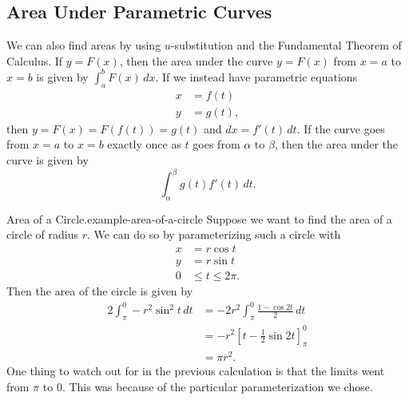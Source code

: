 \documentclass[10pt,]{book}
\numberwithin{equation}{section}
\newcommand{\amp}{&}
\begin{document}
\subsection[{Area Under Parametric Curves}]{Area Under Parametric Curves}\label{subsection-area-under-parametric-curves}
\hypertarget{p-1007}{}%
We can also find areas by using \(u\)-substitution and the Fundamental Theorem of Calculus. If \(y = F(x)\), then the area under the curve \(y=F(x)\) from \(x=a\) to \(x=b\) is given by \(\int_{a}^{b} F(x)\,dx\). If we instead have parametric equations%
\begin{align*}
x \amp = f(t) \\
y \amp = g(t), 
\end{align*}
then \(y = F(x) = F(f(t)) = g(t)\) and \(dx = f'(t)\,dt\). If the curve goes from \(x=a\) to \(x=b\) exactly once as \(t\) goes from \(\alpha\) to \(\beta\), then the area under the curve is given by%
\begin{equation*}
\int_{\alpha}^{\beta}g(t)f'(t)\,dt.
\end{equation*}
%
\begin{example}{Area of a Circle.}{example-area-of-a-circle}%
\hypertarget{p-1008}{}%
Suppose we want to find the area of a circle of radius \(r\). We can do so by parameterizing such a circle with%
%
\begin{align*}
x \amp = r\cos t \\
y \amp = r\sin t \\
0 \amp \leq t\leq 2\pi. 
\end{align*}
\hypertarget{p-1009}{}%
Then the area of the circle is given by%
\begin{align*}
2\int_{\pi}^{0} -r^{2}\sin^{2}t\,dt \amp= -2r^{2}\int_{\pi}^{0}\frac{1-\cos2t}{2}\,dt\\
\amp = -r^{2}\left[t-\frac{1}{2}\sin2t\right]_{\pi}^{0} \\
\amp = \pi r^{2}.
\end{align*}
One thing to watch out for in the previous calculation is that the limits went from \(\pi\) to \(0\). This was because of the particular parameterization we chose.%
\end{example}
%
%
\typeout{************************************************}
\typeout{************************************************}
%
\end{document}
